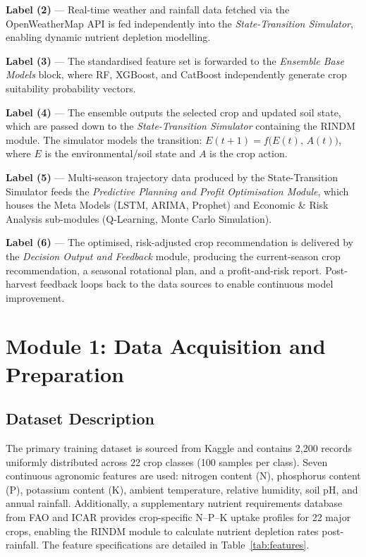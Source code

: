 \documentclass[conference]{IEEEtran}
\begin{document}
\textbf{Label (2)} — Real-time weather and rainfall data fetched via the
OpenWeatherMap API is fed independently into the \textit{State-Transition
Simulator}, enabling dynamic nutrient depletion modelling.

\textbf{Label (3)} — The standardised feature set is forwarded to the
\textit{Ensemble Base Models} block, where RF, XGBoost, and CatBoost
independently generate crop suitability probability vectors.

\textbf{Label (4)} — The ensemble outputs the selected crop and updated soil
state, which are passed down to the \textit{State-Transition Simulator}
containing the RINDM module. The simulator models the transition:
$E(t{+}1) = f\bigl(E(t),\, A(t)\bigr)$, where $E$ is the environmental/soil
state and $A$ is the crop action.

\textbf{Label (5)} — Multi-season trajectory data produced by the
State-Transition Simulator feeds the \textit{Predictive Planning and Profit
Optimisation Module}, which houses the Meta Models (LSTM, ARIMA, Prophet)
and Economic \& Risk Analysis sub-modules (Q-Learning, Monte Carlo
Simulation).

\textbf{Label (6)} — The optimised, risk-adjusted crop recommendation is
delivered by the \textit{Decision Output and Feedback} module, producing the
current-season crop recommendation, a seasonal rotational plan, and a
profit-and-risk report. Post-harvest feedback loops back to the data sources
to enable continuous model improvement.

\section{Module 1: Data Acquisition and Preparation}
\label{sec:module1}

\subsection{Dataset Description}

The primary training dataset \cite{CropDataset} is sourced from Kaggle and
contains 2,200 records uniformly distributed across 22 crop classes (100 samples
per class). Seven continuous agronomic features are used: nitrogen content (N),
phosphorus content (P), potassium content (K), ambient temperature, relative
humidity, soil pH, and annual rainfall. Additionally, a supplementary nutrient
requirements database from FAO and ICAR provides crop-specific N--P--K uptake
profiles for 22 major crops, enabling the RINDM module to calculate nutrient
depletion rates post-rainfall. The feature specifications are detailed in Table~\ref{tab:features}.
\end{document}
